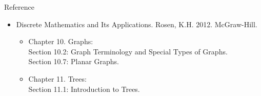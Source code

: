 \documentclass{beamer}
\theoremstyle{definition}
\begin{document}
\begin{frame}{Reference}
    \begin{itemize}
        \item Discrete Mathematics and Its Applications. Rosen, K.H. 2012. McGraw-Hill. \\
        \begin{itemize}
         \item Chapter 10. Graphs: \\
            Section 10.2: Graph Terminology and Special Types of Graphs. \\
            Section 10.7: Planar Graphs. 
        \end{itemize}
        \begin{itemize}
         \item Chapter 11. Trees: \\
            Section 11.1: Introduction to Trees.
        \end{itemize}
    \end{itemize}
\end{frame}
\end{document}
